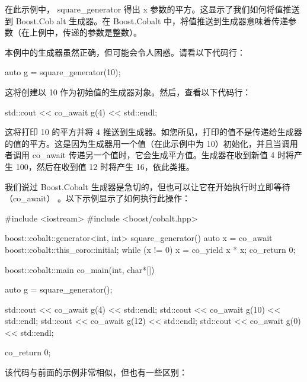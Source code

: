 在此示例中， square\_generator 得出 x 参数的平方。这显示了我们如何将值推送到 Boost.Cob alt 生成器。在 Boost.Cobalt 中，将值推送到生成器意味着传递参数（在上例中，传递的参数是整数）。

本例中的生成器虽然正确，但可能会令人困惑。请看以下代码行：

\begin{cpp}
auto g = square_generator(10);
\end{cpp}

这将创建以 10 作为初始值的生成器对象。然后，查看以下代码行：

\begin{cpp}
std::cout << co_await g(4) << std::endl;
\end{cpp}

这将打印 10 的平方并将 4 推送到生成器。如您所见，打印的值不是传递给生成器的值的平方。这是因为生成器用一个值（在此示例中为 10）初始化，并且当调用者调用 co\_await 传递另一个值时，它会生成平方值。生成器在收到新值 4 时将产生 100，然后在收到值 12 时将产生 16，依此类推。

我们说过 Boost.Cobalt 生成器是急切的，但也可以让它在开始执行时立即等待（co\_await） 。以下示例显示了如何执行此操作：

\begin{cpp}
#include <iostream>
#include <boost/cobalt.hpp>

boost::cobalt::generator<int, int> square_generator() {
    auto x = co_await boost::cobalt::this_coro::initial;
    while (x != 0) {
        x = co_yield x * x;
    }
    co_return 0;
}

boost::cobalt::main co_main(int, char*[]) {
    auto g = square_generator();

    std::cout << co_await g(4) << std::endl;
    std::cout << co_await g(10) << std::endl;
    std::cout << co_await g(12) << std::endl;
    std::cout << co_await g(0) << std::endl;

    co_return 0;
}
\end{cpp}

该代码与前面的示例非常相似，但也有一些区别：

